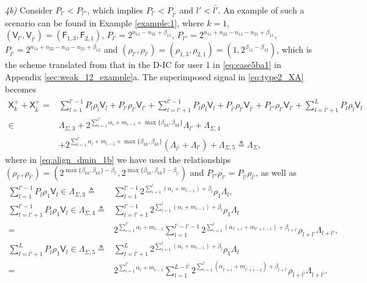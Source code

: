 \documentclass[12pt, draftclsnofoot, onecolumn]{IEEEtran}
\newcommand{\msf}[1]{\mathsf{#1}}
\theoremstyle{definition}
\begin{document}
\emph{4b)} Consider $P_{l'}<P_{l''}$, which implies $P_{l'}<P_{\bar{l'}}$ and $l'<\bar{l'}$. An example of such a scenario can be found in Example \ref{example:1}, where $k=1$, $(\msf{V}_{l'},\msf{V}_{\bar{l'}}) = (\msf{F}_{1,3},\msf{F}_{2,1})$, $P_{l'} = 2^{n_{11}-n_{21}+\beta_{11}}$, $P_{l''} = 2^{n_{11}+n_{22}-n_{12}-n_{21}+\beta_{11}}$, $P_{\bar{l'}} = 2^{n_{11}+n_{22}-n_{12}-n_{21}+\beta_{12}}$ and $(\rho_{l'},\rho_{\bar{l'}})=(\rho_{1,3},\rho_{2,1})=(1,2^{\beta_{11}-\beta_{12}})$, which is the scheme translated from that in the D-IC for user 1 in \eqref{eq:case5ba1} in Appendix \ref{sec:weak_12_example}a. The superimposed signal in \eqref{eq:type2_XA} becomes
\begin{align}
\msf{X}^{+}_k+\msf{X}^{+}_{\bar{k}}=& \sum_{l=1}^{l'-1}P_l\rho_l\msf{V}_l+P_{l'}\rho_{l'}\msf{V}_{l'}+\sum_{l=l'+1}^{\bar{l'}-1}P_l\rho_l\msf{V}_l + P_{\bar{l'}}\rho_{\bar{l'}}\msf{V}_{\bar{l'}}+ P_{l''}\rho_{l'}\msf{V}_{l'}+\sum_{l=\bar{l'}+1}^LP_l\rho_l\msf{V}_l \label{eq:align_dmin_4b} \\
\in& \Lambda_{\Sigma,3}+2^{\sum_{i=1}^{l'}\alpha_i+m_{i-1}+\max\{\beta_{kk},\beta_{k\bar{k}}\}}\Lambda_{l'}
+\Lambda_{\Sigma,4} \nonumber \\
&+ 2^{\sum_{i=1}^{\bar{l'}}\alpha_i+m_{i-1}+\max\{\beta_{kk},\beta_{k\bar{k}}\}}(\Lambda_{\bar{l'}}+\Lambda_{l'}) %
+ \Lambda_{\Sigma,5}\triangleq \Lambda_{\Sigma}, \label{eq:align_dmin_1b}
\end{align}
where in \eqref{eq:align_dmin_1b} we have used the relationships $(\rho_{l'},\rho_{\bar{l'}}) = (2^{\max\{\beta_{kk},\beta_{k\bar{k}}\}-\beta_{l'}},2^{\max\{\beta_{kk},\beta_{k\bar{k}}\}-\beta_{\bar{l'}}})$ and $P_{l''}\rho_{l'}=P_{\bar{l'}}\rho_{\bar{l'}}$, as well as
\begin{align}
\sum_{l=1}^{l'-1}P_l\rho_1\msf{V}_l \in \Lambda_{\Sigma,3} \triangleq& \sum_{l=1}^{l'-1} 2^{\sum_{i=1}^l(\alpha_i+m_{i-1})+\beta_l}\rho_1\Lambda_l, \label{lambda_3aaa}\\
\sum_{l=l'+1}^{l'-1}P_l\rho_1\msf{V}_l\in \Lambda_{\Sigma,4} \triangleq& \sum_{l=l'+1}^{l'-1} 2^{\sum_{i=1}^l(\alpha_i+m_{i-1})+\beta_l}\rho_1\Lambda_l \nonumber\\
= &2^{\sum_{i=1}^{l'}\alpha_i+m_{i-1}}\sum_{l=1}^{\bar{l'}-l'-1} 2^{\sum_{i=1}^l(\alpha_{l'+i}+m_{l'+i-1})+\beta_{l+l'}}\rho_{l+l'}\Lambda_{l+l'}, \label{lambda_2}\\
\sum_{l=\bar{l'}+1}^LP_l\rho_1\msf{V}_l\in\Lambda_{\Sigma,5} \triangleq& \sum_{l=\bar{l'}+1}^{L} 2^{\sum_{i=1}^l(\alpha_i+m_{i-1})+\beta_l}\rho_1\Lambda_l \nonumber\\
= &2^{\sum_{i=1}^{\bar{l'}}\alpha_i+m_{i-1}}\sum_{l=1}^{L-\bar{l'}} 2^{\sum_{i=1}^l(\alpha_{\bar{l'}+i}+m_{\bar{l'}+i-1})+\beta_{l+\bar{l'}}}\rho_{l+\bar{l'}}\Lambda_{l+\bar{l'}}.
\end{align}
\end{document}
